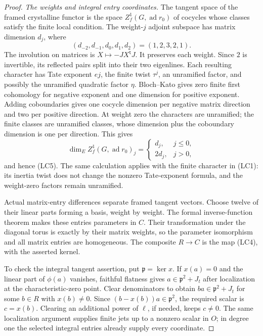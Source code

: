 \begin{proof}
\emph{The weights and integral entry coordinates.}
The tangent space of the framed crystalline functor is the space
$Z_f^1(G,\operatorname{ad}r_0)$ of cocycles whose classes satisfy the
finite local condition.  The weight-$j$ adjoint subspace has matrix
dimension $d_j$, where
\[
                    (d_{-2},d_{-1},d_0,d_1,d_2)=(1,2,3,2,1).
\]
The involution on matrices is $X\mapsto-JX^{\mathsf t}J$.
It preserves each weight.  Since $2$ is invertible, its reflected
pairs split into their two eigenlines.  Each resulting character
has Tate exponent $ej$, the finite twist $\tau^j$, an unramified
factor, and possibly the unramified quadratic factor $\eta$.
Bloch--Kato gives zero finite first cohomology for negative exponent
and one dimension for positive exponent.  Adding coboundaries gives
one cocycle dimension per negative matrix direction and two per
positive direction.  At weight zero the characters are unramified;
the finite classes are unramified classes, whose dimension plus the
coboundary dimension is one per direction.  This gives
\[
 \dim_E Z_f^1(G,\operatorname{ad}r_0)_j
       =\begin{cases}d_j,&j\le0,\\2d_j,&j>0,\end{cases}
                                                               \tag{LC8}
\]
and hence (LC5).  The same calculation applies with the finite
character in (LC1): its inertia twist does not change the nonzero
Tate-exponent formula, and the weight-zero factors remain unramified.

Actual matrix-entry differences separate framed tangent vectors.
Choose twelve of their linear parts forming a basis, weight by
weight.  The formal inverse-function theorem makes these entries
parameters in $C$.  Their transformation under the diagonal torus
is exactly by their matrix weights, so the parameter isomorphism and
all matrix entries are homogeneous.  The composite $R\to C$ is
the map (LC4), with the asserted kernel.

To check the integral tangent assertion, put $\mathfrak p=\ker x$.
If $x(a)=0$ and the linear part of $\phi(a)$ vanishes, faithful
flatness gives $a\in\mathfrak p^2+J_t$ after localization at the
characteristic-zero point.  Clear denominators to obtain
$ba\in\mathfrak p^2+J_t$ for some $b\in R$ with $x(b)\ne0$.
Since $(b-x(b))a\in\mathfrak p^2$, the required scalar is
$c=x(b)$.  Clearing an additional power of $\ell$, if needed,
keeps $c\ne0$.  The same localization argument supplies finite
jets up to a nonzero scalar in $O$; in degree one the selected
integral entries already supply every coordinate.


\end{proof}
